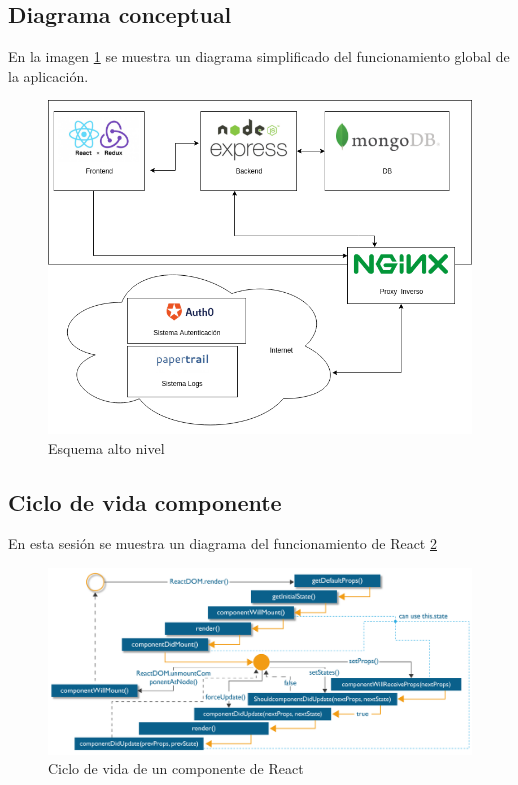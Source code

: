 \subsection {Diagrama conceptual}
En la imagen \ref{fig:esquema_alto_nivel} se muestra un diagrama simplificado del funcionamiento global de la aplicación.
\begin{figure}
  \begin{center}
    \includegraphics[width=\textwidth]{imagenes/diagrama_conceptual.png}
    \caption{Esquema alto nivel}
    \label{fig:esquema_alto_nivel}
  \end{center}
\end{figure}


\subsection {Ciclo de vida componente}
En esta sesión se muestra un diagrama del funcionamiento de React \ref{fig:react}
\begin{figure}
  \begin{center}
    \includegraphics[width=\textwidth]{imagenes/ReactDOM_edureka.png}
    \caption{Ciclo de vida de un componente de React}
    \label{fig:react}
  \end{center}
\end{figure}

